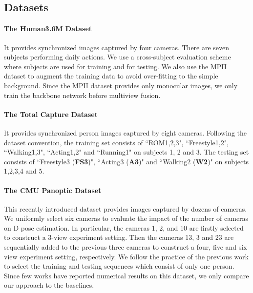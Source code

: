 \subsection{Datasets}
\paragraph{The Human3.6M Dataset \citep{ionescu2014human3}} It provides synchronized images captured by four cameras. There are seven subjects performing daily actions. We use a cross-subject evaluation scheme where subjects  are used for training and  for testing. We also use the MPII dataset \citep{andriluka14cvpr} to augment the training data to avoid over-fitting to the simple background. Since the MPII dataset provides only monocular images, we only train the backbone network before multiview fusion. 




\paragraph{The Total Capture Dataset \citep{trumble2017total}} It provides synchronized person images captured by eight cameras. Following the dataset convention, the training set consists of ``ROM1,2,3", ``Freestyle1,2", ``Walking1,3", ``Acting1,2" and ``Running1"   on subjects 1, 2 and 3. The testing set consists of ``Freestyle3 (\textbf{FS3})", ``Acting3 (\textbf{A3})" and ``Walking2 (\textbf{W2})" on subjects 1,2,3,4 and 5.



\paragraph{The CMU Panoptic Dataset \citep{joo2019panoptic}}
This recently introduced dataset provides images captured by dozens of cameras. We uniformly select six cameras to evaluate the impact of the number of cameras on D pose estimation. In particular, the cameras 1, 2, and 10 are firstly selected to construct a 3-view experiment setting. Then the cameras 13, 3 and 23 are sequentially added to the previous three cameras to construct a four, five and six view experiment setting, respectively. We follow the practice of the previous work \citep{xiang2019monocular} to select the training and testing sequences which consist of only one person. Since few works have reported numerical results on this dataset, we only compare our approach to the baselines.




